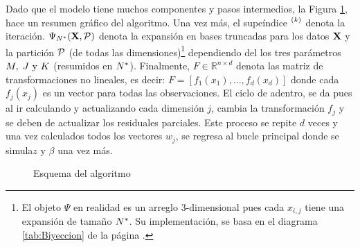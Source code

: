 \documentclass[../Main/Main.tex]{subfiles}
\begin{document}
Dado que el modelo tiene muchos componentes y pasos intermedios, la Figura \ref{fig:DiagramaAlgoritmo}, hace un resumen gráfico del algoritmo. Una vez más, el supeíndice $\iter{k}$ denota la iteración. $\Psi_{\N}(\xmat, \P)$ denota la expansión en bases truncadas para los datos $\xmat$ y la partición $\P$ (de todas las dimensiones)\footnote{El objeto $\Psi$ en realidad es un arreglo 3-dimensional pues cada $x_{i,j}$ tiene una expansión de tamaño $\N$. Su implementación, se basa en el diagrama \ref{tab:Biyeccion} de la página \pageref{tab:Biyeccion}.} dependiendo del los tres parámetros $\MJK$ (resumidos en $\N$). Finalmente, $F\in\mathbb{R}^{n\times d}$ denota las matriz de transformaciones no lineales, es decir: $F = [f_1(x_1),\ldots,f_d(x_d)]$ donde cada $f_j(x_j)$ es un vector para todas las observaciones. El ciclo de adentro, se da pues al ir calculando y actualizando cada dimensión $j$, cambia la transformación $f_j$ y se deben de actualizar los residuales parciales. Este proceso se repite $d$ veces y una vez calculados todos los vectores $w_j$, se regresa al bucle principal donde se simula$z$ y $\beta$ una vez más. 

\begin{figure}[h]
\centering
{}
\caption{Esquema del algoritmo}
\label{fig:DiagramaAlgoritmo}
\end{figure}
\end{document}
